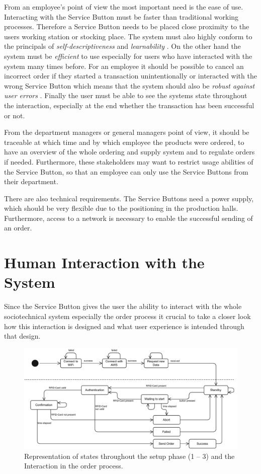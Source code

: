 From an employee's point of view the most important need is the ease of use. Interacting with the Service Button must be faster than traditional working processes. Therefore a Service Button needs to be placed close proximity to the users working station or stocking place. The system must also highly conform to the principals of \textit{self-descriptiveness} and \textit{learnability} \cite{ISO:9241-110:2020}. On the other hand the system must be \textit{efficient} \cite{ISO:9241-110:2020} to use especially for users who have interacted with the system many times before. For an employee it should be possible to cancel an incorrect order if they started a transaction unintentionally or interacted with the wrong Service Button which means that the system should also be \textit{robust against user errors} \cite{ISO:9241-110:2020}.
Finally the user must be able to see the systems state throughout the interaction, especially at the end whether the transaction has been successful or not.

From the department managers or general managers point of view, it should be traceable at which time and by which employee the products were ordered, to have an overview of the whole ordering and supply system and to regulate orders if needed. Furthermore, these stakeholders may want to restrict usage abilities of the Service Button, so that an employee can only use the Service Buttons from their department.

There are also technical requirements. The Service Buttons need a power supply, which should be very flexible due to the positioning in the production halls. Furthermore, access to a network is necessary to enable the successful sending of an order.

\section{Human Interaction with the System}
\label{sec:Interaction}

Since the Service Button gives the user the ability to interact with the whole sociotechnical system especially the order process it crucial to take a closer look how this interaction is designed and what user experience is intended through that design.

\begin{figure}
    \center
    \includegraphics[width=\linewidth]{figures/states.drawio.pdf}
    \caption{Representation of states throughout the setup phase (1 – 3) and the Interaction in the order process.}
    \label{fig:states}
\end{figure}


